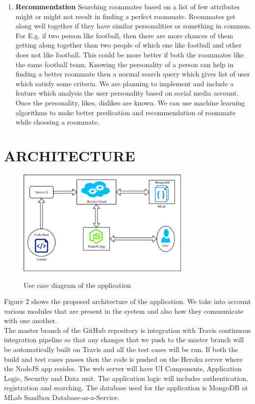\documentclass{sig-alternate-05-2015}
\begin{document}
\begin{enumerate}
\item \textbf{Recommendation}
Searching roommates based on a list of few attributes might or might not result in finding a perfect roommate. Roommates get along well together if they have similar personalities or something in common. For E.g. if two person like football, then there are more chances of them getting along together than two people of which one like football and other does not like football. This could be more better if both the roommates like the same football team. Knowing the personality of a person can help in finding a better roommate then a normal search query which gives list of user which satisfy some criteria. We are planning to implement and include a feature which analysis the user personality based on social media account. Once the personality, likes, dislikes are known. We can use machine learning algorithms to make better predication and recommendation of roommate while choosing a roommate.
\end{enumerate}

\section{ARCHITECTURE}
\begin{figure}[h]
 \centering
\includegraphics[width=8.5cm]{ArchitectureRoomate.png}\\
\caption{Use case diagram of the application}
\end{figure}

Figure 2 shows the proposed architecture of the application. We take into account various modules that are present in the system and also how they communicate with one another. \\

The master branch of the GitHub repository is integration with Travis continuous integration pipeline so that any changes that we push to the master branch will be automatically built on Travis and all the test cases will be run. If both the build and test cases passes then the code is pushed on the Heroku server where the NodeJS app resides. The web server will have UI Components, Application Logic, Security and Data unit. The application logic will includes authentication, registration and searching. The database used for the application is  MongoDB at MLab Sandbox Database-as-a-Service. 
\end{document}
